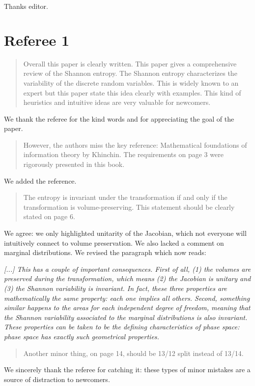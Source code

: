 \documentclass[11pt]{article}
\begin{document}
	
	Thanks editor.


\section*{Referee 1}

\begin{quote}
Overall this paper is clearly written. This paper gives a comprehensive review of the Shannon entropy. The Shannon entropy characterizes the variability of the discrete random variables. This is widely known to an expert but this paper state this idea clearly with examples. This kind of heuristics and intuitive ideas are very valuable for newcomers.
\end{quote}
We thank the referee for the kind words and for appreciating the goal of the paper.

\begin{quote}
However, the authors miss the key reference: Mathematical foundations of information theory by Khinchin. The requirements on page 3 were rigorously presented in this book. 
\end{quote}
We added the reference.

\begin{quote}
The entropy is invariant under the transformation if and only if the transformation is volume-preserving. This statement should be clearly stated on page 6.
\end{quote}
We agree: we only highlighted unitarity of the Jacobian, which not everyone will intuitively connect to volume preservation. We also lacked a comment on marginal distributions. We revised the paragraph which now reads:

\emph{[...] This has a couple of important consequences. First of all, (1) the volumes are preserved during the transformation, which means (2) the Jacobian is unitary and (3) the Shannon variability is invariant. In fact, these three properties are mathematically the same property: each one implies all others. Second, something similar happens to the areas for each independent degree of freedom, meaning that the Shannon variability associated to the marginal distributions is also invariant. These properties can be taken to be the defining characteristics of phase space: phase space has exactly such geometrical properties.}

\begin{quote}
Another minor thing, on page 14, should be 13/12 split instead of 13/14.  
\end{quote}
We sincerely thank the referee for catching it: these types of minor mistakes are a source of distraction to newcomers.
\end{document}
